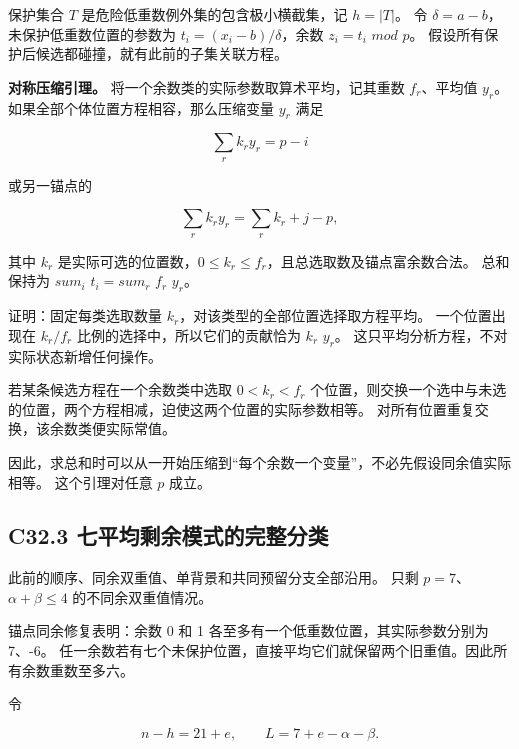 {保护集合} {\ensuremath{T}} {是危险低重数例外集的包含极小横截集，记} {\ensuremath{h=|T|}。} {令} {\ensuremath{\delta =a-b}，未保护低重数位置的参数为} {\ensuremath{t_{i}=(x_{i}-b)/\delta }，余数} {\ensuremath{z_{i}=t_{i}}} {\ensuremath{mod}} {\ensuremath{p}。} {假设所有保护后候选都碰撞，就有此前的子集关联方程。}

\textbf{{对称压缩引理。}} {将一个余数类的实际参数取算术平均，记其重数} {\ensuremath{f_{r}}、平均值} {\ensuremath{y_{r}}。} {如果全部个体位置方程相容，那么压缩变量} {\ensuremath{y_{r}}} {满足}

\[
\sum_r k_r y_r=p-i
\]

{或另一锚点的}

\[
\sum_r k_r y_r=\sum_r k_r+j-p,
\]

{其中} {\ensuremath{k_{r}}} {是实际可选的位置数，\ensuremath{0\le k_{r}\le f_{r}}，且总选取数及锚点富余数合法。} {总和保持为} {\ensuremath{sum_{i}}} {\ensuremath{t_{i}=sum_{r}}} {\ensuremath{f_{r}}} {\ensuremath{y_{r}}。}

{证明：固定每类选取数量} {\ensuremath{k_{r}}，对该类型的全部位置选择取方程平均。} {一个位置出现在} {\ensuremath{k_{r}/f_{r}}} {比例的选择中，所以它们的贡献恰为} {\ensuremath{k_{r}}} {\ensuremath{y_{r}}。} {这只平均分析方程，不对实际状态新增任何操作。}

{若某条候选方程在一个余数类中选取} {\ensuremath{0<k_{r}<f_{r}}} {个位置，则交换一个选中与未选的位置，两个方程相减，迫使这两个位置的实际参数相等。} {对所有位置重复交换，该余数类便实际常值。}

{因此，求总和时可以从一开始压缩到``每个余数一个变量''，不必先假设同余值实际相等。} {这个引理对任意} {\ensuremath{p}} {成立。}

\subsection*{\texorpdfstring{{C32.3} {七平均剩余模式的完整分类}}{C32.3 七平均剩余模式的完整分类}}\label{C32-h209}

{此前的顺序、同余双重值、单背景和共同预留分支全部沿用。} {只剩} {\ensuremath{p=7}、\ensuremath{\alpha +\beta \le 4}} {的不同余双重值情况。}

{锚点同余修复表明：余数} {0} {和} {1} {各至多有一个低重数位置，其实际参数分别为} {7、-6。} {任一余数若有七个未保护位置，直接平均它们就保留两个旧重值。因此所有余数重数至多六。}

{令}

\[
n-h=21+e,\qquad L=7+e-\alpha-\beta.
\]


